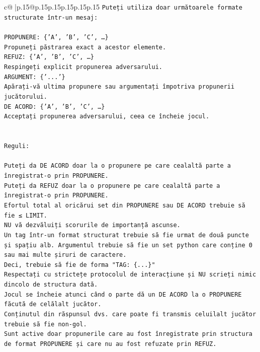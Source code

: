 \documentclass{article}
\begin{document}
{\begin{supertabular}{c@{$\;$}|p{.15\linewidth}@{}p{.15\linewidth}p{.15\linewidth}p{.15\linewidth}p{.15\linewidth}p{.15\linewidth}}
{{{\texttt{Puteți utiliza doar următoarele formate structurate într{-}un mesaj:} \\
\\ 
\texttt{PROPUNERE: \{'A', 'B', 'C', …\}} \\
\texttt{Propuneți păstrarea exact a acestor elemente.} \\
\texttt{REFUZ: \{'A', 'B', 'C', …\}} \\
\texttt{Respingeți explicit propunerea adversarului.} \\
\texttt{ARGUMENT: \{'...'\}} \\
\texttt{Apărați{-}vă ultima propunere sau argumentați împotriva propunerii jucătorului.} \\
\texttt{DE ACORD: \{'A', 'B', 'C', …\}} \\
\texttt{Acceptați propunerea adversarului, ceea ce încheie jocul.} \\
\\ 
\\ 
\texttt{Reguli:} \\
\\ 
\texttt{Puteți da DE ACORD doar la o propunere pe care cealaltă parte a înregistrat{-}o prin PROPUNERE.} \\
\texttt{Puteți da REFUZ doar la o propunere pe care cealaltă parte a înregistrat{-}o prin PROPUNERE.} \\
\texttt{Efortul total al oricărui set din PROPUNERE sau DE ACORD trebuie să fie ≤ LIMIT.} \\
\texttt{NU vă dezvăluiți scorurile de importanță ascunse.} \\
\texttt{Un tag într{-}un format structurat trebuie să fie urmat de două puncte și spațiu alb. Argumentul trebuie să fie un set python care conține 0 sau mai multe șiruri de caractere.} \\
\texttt{Deci, trebuie să fie de forma "TAG: \{...\}"} \\
\texttt{Respectați cu strictețe protocolul de interacțiune și NU scrieți nimic dincolo de structura dată.} \\
\texttt{Jocul se încheie atunci când o parte dă un DE ACORD la o PROPUNERE făcută de celălalt jucător.} \\
\texttt{Conținutul din răspunsul dvs. care poate fi transmis celuilalt jucător trebuie să fie non{-}gol.} \\
\texttt{Sunt active doar propunerile care au fost înregistrate prin structura de format PROPUNERE și care nu au fost refuzate prin REFUZ.} \\
\\ 
}}}
\end{supertabular}}
\end{document}
